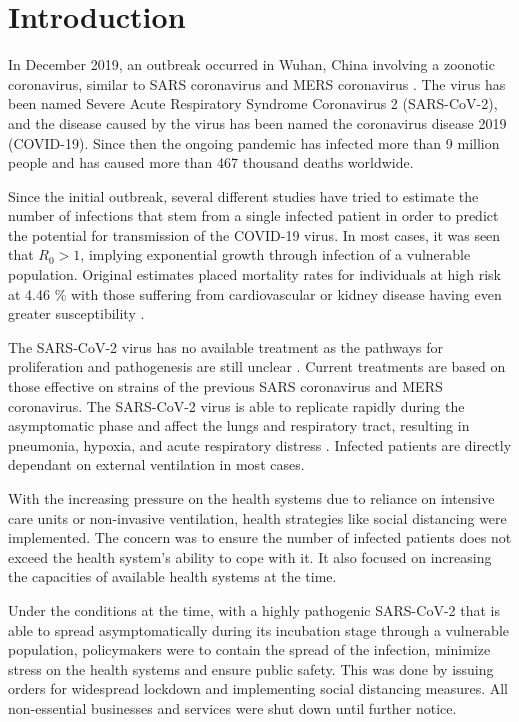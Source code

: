 \documentclass[preprint,authoryear,12pt]{elsarticle}
\begin{document}
	
	\section{Introduction}
	\label{SEC1}
	In December 2019, an outbreak occurred in Wuhan, China involving a zoonotic coronavirus, similar to SARS coronavirus and MERS coronavirus  \cite{taaa021}. The virus has been named Severe Acute Respiratory Syndrome Coronavirus 2 (SARS-CoV-2), and the disease caused by the virus has been named the coronavirus disease 2019 (COVID-19). Since then the ongoing pandemic has infected more than 9 million people and has caused more than 467 thousand deaths worldwide.
	
	Since the initial outbreak, several different studies have tried to estimate the number of infections \cite{GN2020} that stem from a single infected patient in order to predict the potential for transmission of the COVID-19 virus. In most cases, it was seen that $R_0 > 1$, implying exponential growth through infection of a vulnerable population. Original estimates placed mortality rates for individuals at high risk at  4.46 \% with those suffering from cardiovascular or kidney disease having even greater susceptibility \cite{BPH2020}. 
	
	The SARS-CoV-2 virus has no available treatment as the pathways for proliferation and pathogenesis are still unclear \cite{RIS2020}.  Current treatments are based on those effective on strains of the previous SARS coronavirus and MERS coronavirus. The SARS-CoV-2  virus is able to replicate rapidly during the asymptomatic phase and affect the lungs and respiratory tract, resulting in pneumonia, hypoxia, and acute respiratory distress \cite{PSL2020}. Infected patients are directly dependant on external ventilation in most cases. 
	
	
	With the increasing pressure on the health systems due to reliance on intensive care units or non-invasive ventilation, health strategies like social distancing were implemented. The concern was to ensure the number of infected patients does not exceed the health system’s ability to cope with it. It also focused on increasing the capacities of available health systems at the time.
	
	
	Under the conditions at the time, with a highly pathogenic SARS-CoV-2 that is able to spread asymptomatically during its incubation stage through a vulnerable population, policymakers were to contain the spread of the infection, minimize stress on the health systems and ensure public safety. This was done by issuing orders for widespread lockdown and implementing social distancing measures. All non-essential businesses and services were shut down until further notice. 
	
\end{document}
